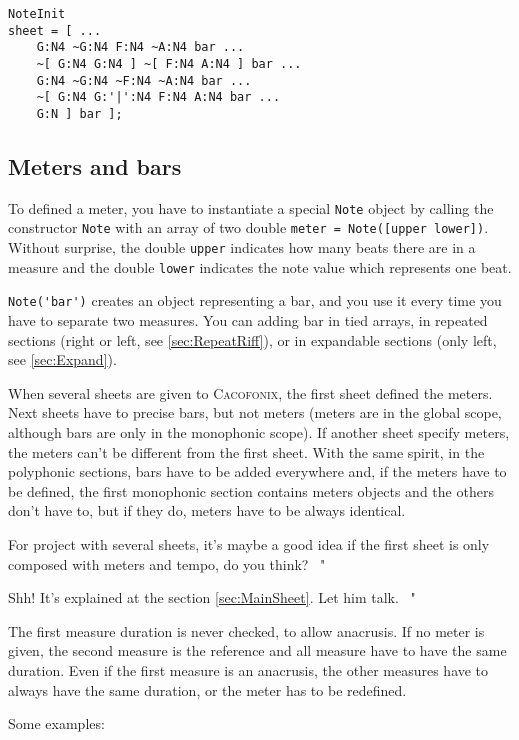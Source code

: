 \documentclass{article}
\newcommand\cacofonix{\textsc{Cacofonix}\xspace}
\newcommand\note{\lstinline!Note!\xspace}
\newenvironment{meenv}{ \par \noindent \makebox[6em][r]{ \textcolor{mecolor}{Me}: " --~}}{~"}
\newenvironment{myselfenv}{ \par \noindent \makebox[6em][r]{ \textcolor{myselfcolor}{Myself}: " --~}}{~"}
\newcommand{ \me }[1]{%
\begin{meenv}%
	#1%
\end{meenv} }
\newcommand{ \myself }[1]{%
\begin{myselfenv}%
	#1%
\end{myselfenv} }
\begin{document}
\begin{lstlisting}
NoteInit
sheet = [ ...
	G:N4 ~G:N4 F:N4 ~A:N4 bar ...
	~[ G:N4 G:N4 ] ~[ F:N4 A:N4 ] bar ...
	G:N4 ~G:N4 ~F:N4 ~A:N4 bar ...
	~[ G:N4 G:'|':N4 F:N4 A:N4 bar ...
	G:N ] bar ];
\end{lstlisting}

\subsection{Meters and bars}
\label{sec:MetersAndBars}

To defined a meter, you have to instantiate a special \note object by calling the constructor \lstinline!Note! with an array of two double \lstinline!meter = Note([upper lower])!. Without surprise, the double \lstinline!upper! indicates how many beats there are in a measure and the double \lstinline!lower! indicates the note value which represents one beat.

\lstinline!Note('bar')! creates an object representing a bar, and you use it every time you have to separate two measures. You can adding bar in tied arrays, in repeated sections (right or left, see \ref{sec:RepeatRiff}), or in expandable sections (only left, see \ref{sec:Expand}).

When several sheets are given to \cacofonix, the first sheet defined the meters. Next sheets have to precise bars, but not meters (meters are in the global scope, although bars are only in the monophonic scope). If another sheet specify meters, the meters can't be different from the first sheet. With the same spirit, in the polyphonic sections, bars have to be added everywhere and, if the meters have to be defined, the first monophonic section contains meters objects and the others don't have to, but if they do, meters have to be always identical.

\me{For project with several sheets, it's maybe a good idea if the first sheet is only composed with meters and tempo, do you think?}
\myself{Shh! It's explained at the section \ref{sec:MainSheet}. Let him talk.}

The first measure duration is never checked, to allow anacrusis. If no meter is given, the second measure is the reference and all measure have to have the same duration. Even if the first measure is an anacrusis, the other measures have to always have the same duration, or the meter has to be redefined.

Some examples: \\
\end{document}
